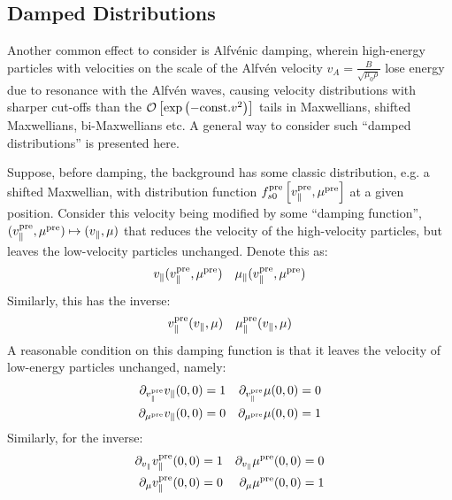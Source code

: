 \subsection{Damped Distributions}
    Another common effect to consider is Alfvénic damping, wherein high-energy particles with velocities on the scale of the Alfvén velocity $v_{A} = \frac{B}{\sqrt{\mu_{0}\rho}}$ lose energy due to resonance with the Alfvén waves, causing velocity distributions with sharper cut-offs than the $\mathcal{O}\left[\exp\left(- {\rm const.}v^{2}\right)\right]$ tails in Maxwellians, shifted Maxwellians, bi-Maxwellians etc. A general way to consider such ``damped distributions'' is presented here.
    
    Suppose, before damping, the background has some classic distribution, e.g. a shifted Maxwellian, with distribution function $f_{s0}^{\rm pre}\left[v_{\parallel}^{\rm pre}, \mu^{\rm pre}\right]$ at a given position. Consider this velocity being modified by some ``damping function'', $(v_{\parallel}^{\rm pre}, \mu^{\rm pre}) \mapsto (v_{\parallel}, \mu)$ that reduces the velocity of the high-velocity particles, but leaves the low-velocity particles unchanged. Denote this as:
    \begin{align}
        v_{\parallel}(v_{\parallel}^{\rm pre}, \mu^{\rm pre})  &&
        \mu_{\parallel}(v_{\parallel}^{\rm pre}, \mu^{\rm pre})
    \end{align}
    Similarly, this has the inverse:
    \begin{align}
        v_{\parallel}^{\rm pre}(v_{\parallel}, \mu)  &&
        \mu_{\parallel}^{\rm pre}(v_{\parallel}, \mu)
    \end{align}
    A reasonable condition on this damping function is that it leaves the velocity of low-energy particles unchanged, namely:
    \begin{align}
        \partial_{v_{\parallel}^{\rm pre}}v_{\parallel}(0, 0)  =  1  &&
        \partial_{v_{\parallel}^{\rm pre}}\mu(0, 0)  =  0  \\
        \partial_{\mu^{\rm pre}}v_{\parallel}(0, 0)  =  0  &&
        \partial_{\mu^{\rm pre}}\mu(0, 0)  =  1
    \end{align}
    Similarly, for the inverse:
    \begin{align}
        \partial_{v_{\parallel}}v_{\parallel}^{\rm pre}(0, 0)  =  1  &&
        \partial_{v_{\parallel}}\mu^{\rm pre}(0, 0)  =  0  \\
        \partial_{\mu}v_{\parallel}^{\rm pre}(0, 0)  =  0  &&
        \partial_{\mu}\mu^{\rm pre}(0, 0)  =  1
    \end{align}
